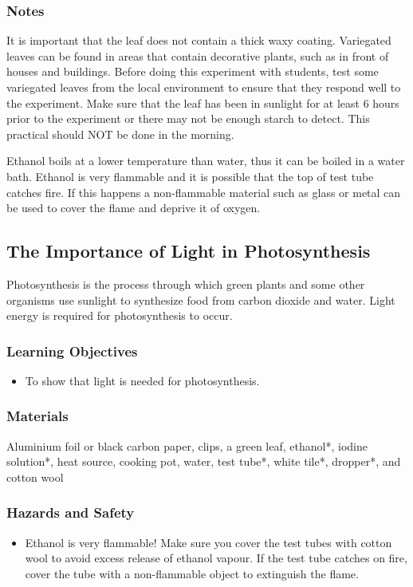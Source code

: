 \subsubsection*{Notes}
It is important that the leaf does not contain a thick waxy coating. Variegated leaves can be found in areas that contain decorative plants, such as in front of houses and buildings. Before doing this experiment with students, test some variegated leaves from the local environment to ensure that they respond well to the experiment. Make sure that the leaf has been in sunlight for at least 6 hours prior to the experiment or there may not be enough starch to detect. This practical should NOT be done in the morning.

Ethanol boils at a lower temperature than water, thus it can be boiled in a water bath. Ethanol is very flammable and it is possible that the top of test tube catches fire. If this happens a non-flammable material such as glass or metal can be used to cover the flame and deprive it of oxygen.

\subsection{The Importance of Light in Photosynthesis}
Photosynthesis is the process through which green plants and some other organisms use sunlight to synthesize food from carbon dioxide and water. Light energy is required for photosynthesis to occur.

\subsubsection*{Learning Objectives}
\begin{itemize}
\item{To show that light is needed for photosynthesis.}
\end{itemize}

\subsubsection*{Materials}
Aluminium foil or black carbon paper, clips, a green leaf, ethanol*, iodine solution*, heat source, cooking pot, water, test tube*, white tile*, dropper*, and cotton wool

\subsubsection*{Hazards and Safety}
\begin{itemize}
\item{Ethanol is very flammable! Make sure you cover the test tubes with cotton wool to avoid excess release of ethanol vapour. If the test tube catches on fire, cover the tube with a non-flammable object to extinguish the flame.}
\end{itemize}

